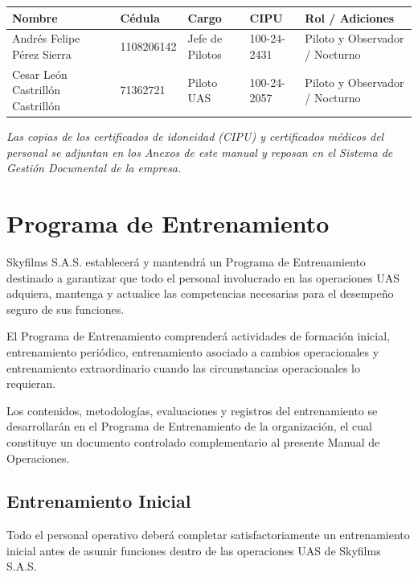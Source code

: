 \begin{table}[H]
    \centering
    \renewcommand{\arraystretch}{1.2}
    \begin{tabular}{|p{4cm}|p{2.5cm}|p{2.5cm}|p{2cm}|p{3.5cm}|}
        \hline
        \rowcolor[gray]{0.9} \textbf{Nombre} & \textbf{Cédula} & \textbf{Cargo} & \textbf{CIPU} & \textbf{ Rol / Adiciones} \\ \hline
        Andrés Felipe Pérez Sierra & 1108206142 & Jefe de Pilotos & 100-24-2431 & Piloto y Observador / Nocturno \\ \hline
        Cesar León Castrillón Castrillón & 71362721 & Piloto UAS & 100-24-2057 &Piloto y Observador / Nocturno \\ \hline
    \end{tabular}
\end{table}

\textit{Las copias de los certificados de idoneidad (CIPU) y certificados médicos del personal se adjuntan en los Anexos de este manual y reposan en el Sistema de Gestión Documental de la empresa.}



\section{Programa de Entrenamiento}

Skyfilms S.A.S. establecerá y mantendrá un Programa de Entrenamiento destinado a garantizar que todo el personal involucrado en las operaciones UAS adquiera, mantenga y actualice las competencias necesarias para el desempeño seguro de sus funciones.

El Programa de Entrenamiento comprenderá actividades de formación inicial, entrenamiento periódico, entrenamiento asociado a cambios operacionales y entrenamiento extraordinario cuando las circunstancias operacionales lo requieran.

Los contenidos, metodologías, evaluaciones y registros del entrenamiento se desarrollarán en el Programa de Entrenamiento de la organización, el cual constituye un documento controlado complementario al presente Manual de Operaciones.

\subsection{Entrenamiento Inicial}

Todo el personal operativo deberá completar satisfactoriamente un entrenamiento inicial antes de asumir funciones dentro de las operaciones UAS de Skyfilms S.A.S.

